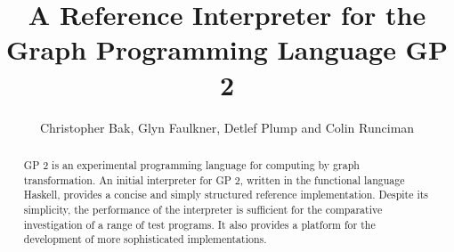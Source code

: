 \documentclass{eptcs}
\begin{document}
\title{A Reference Interpreter for the Graph Programming Language GP 2}

\author{Christopher Bak, Glyn Faulkner, Detlef Plump and Colin Runciman
}

\def\authorrunning{C. Bak, G. Faulkner, D. Plump \& C. Runciman} 
\def\titlerunning{A Reference Interpreter for GP2}

\maketitle
\thispagestyle{empty}


\begin{abstract}
GP 2 is an experimental programming language
for computing by graph transformation.
An initial interpreter for GP 2, written
in the functional language Haskell, provides
a concise and simply structured reference
implementation.
Despite its simplicity, the performance of
the interpreter is sufficient for the
comparative investigation of a range of test
programs.
It also provides a platform for the development
of more sophisticated implementations.
\end{abstract}









{}

\end{document}
